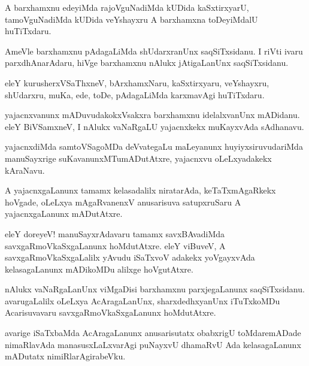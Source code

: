 \documentclass{article}
\begin{document}
\begin{mn}
A barxhamxnu edeyiMda rajoVguNadiMda kUDida kaSxtirxyarU,
tamoVguNadiMda kUDida veYshayxru A barxhamxna toDeyiMdalU huTiTxdaru.
\end{mn}

\begin{mn}%
AmeVle barxhamxnu pAdagaLiMda shUdarxranUnx saqSiTxsidanu. I riVti
ivaru parxdhAnarAdaru, hiVge barxhamxnu nAlukx jAtigaLanUnx saqSiTxsidanu.
\end{mn}

\begin{mn}
eleY kurusherxVSaThxneV, bArxhamxNaru, kaSxtirxyaru, veYshayxru,
shUdarxru, muKa, ede, toDe, pAdagaLiMda karxmavAgi huTiTxdaru.
\end{mn}

\begin{mn}
yajacnxvanunx mADuvudakokxVsakxra barxhamxnu idelalxvanUnx
mADidanu. eleY BiVSamxneV, I nAlukx vaNaRgaLU yajacnxkekx muKayxvAda sAdhanavu.
\end{mn}

\begin{mn}
yajacnxdiMda samtoVSagoMDa deVvategaLu maLeyanunx huyiyxsiruvudariMda
manuSayxrige suKavanunxMTumADutAtxre, yajacnxvu oLeLxyadakekx kAraNavu.
\end{mn}

\begin{mn}
A yajacnxgaLanunx tamamx kelasadalilx niratarAda, keTaTxmAgaRkekx
hoVgade, oLeLxya mAgaRvanenxV anusarisuva satupxruSaru A
yajacnxgaLanunx mADutAtxre.
\end{mn}

\begin{mn}
eleY doreyeV! manuSayxrAdavaru tamamx savxBAvadiMda
savxgaRmoVkaSxgaLanunx hoMdutAtxre. eleY viBuveV, A
savxgaRmoVkaSxgaLalilx yAvudu iSaTxvoV adakekx yoVgayxvAda
kelasagaLanunx mADikoMDu alilxge hoVgutAtxre.
\end{mn}

\begin{mn}%
nAlukx vaNaRgaLanUnx viMgaDisi barxhamxnu parxjegaLanunx
saqSiTxsidanu. avarugaLalilx oLeLxya AcAragaLanUnx, sharxdedhxyanUnx
iTuTxkoMDu Acarisuvavaru savxgaRmoVkaSxgaLanunx hoMdutAtxre.
\end{mn}

\begin{mn}
avarige iSaTxbaMda AcAragaLanunx anusarisutatx obabxrigU toMdaremADade
nimaRlavAda manasusxLaLxvarAgi puNayxvU dhamaRvU Ada kelasagaLanunx
mADutatx nimiRlarAgirabeVku.
\end{mn}
\end{document}
